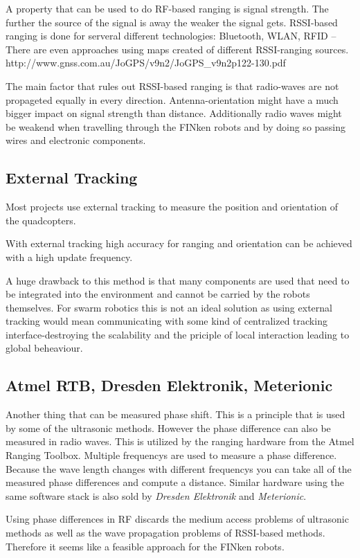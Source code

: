 A property that can be used to do RF-based ranging is signal strength.
The further the source of the signal is away the weaker the signal gets.
RSSI-based ranging is done for serveral different technologies: Bluetooth, WLAN, RFID –
There are even approaches using maps created of different RSSI-ranging sources. http://www.gnss.com.au/JoGPS/v9n2/JoGPS\_v9n2p122-130.pdf 

The main factor that rules out RSSI-based ranging is that radio-waves are not propageted equally in every direction. 
Antenna-orientation might have a much bigger impact on signal strength than distance.
Additionally radio waves might be weakend when travelling through the FINken robots and by doing so passing wires and electronic components.

\subsection{External Tracking}

Most projects use external tracking to measure the position and orientation of the quadcopters. 

With external tracking high accuracy for ranging and orientation can be achieved with a high update frequency.


A huge drawback to this method is that many components are used that need to be integrated into the environment and cannot be carried by the robots themselves.
For swarm robotics this is not an ideal solution as using external tracking would mean communicating with some kind of centralized tracking interface-destroying the scalability and the priciple of local interaction leading to global beheaviour.
\subsection{Atmel RTB, Dresden Elektronik, Meterionic}

Another thing that can be measured phase shift.
This is a principle that is used by some of the ultrasonic methods.
However the phase difference can also be measured in radio waves.
This is utilized by the ranging hardware from the Atmel Ranging Toolbox.
Multiple frequencys are used to measure a phase difference.
Because the wave length changes with different frequencys you can take all of the measured phase differences and compute a distance.
Similar hardware using the same software stack is also sold by \emph{Dresden Elektronik} and \emph{Meterionic}.

Using phase differences in RF discards the medium access problems of ultrasonic methods as well as the wave propagation problems of RSSI-based methods.
Therefore it seems like a feasible approach for the FINken robots.

